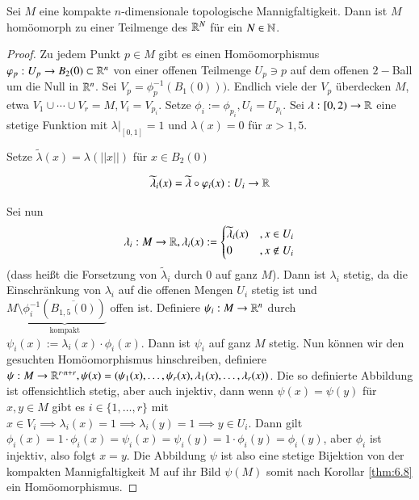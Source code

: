 \documentclass[a4paper,10pt]{scrartcl}
\begin{document}
\begin{st}
 Sei $M$ eine kompakte $n$-dimensionale topologische Mannigfaltigkeit. Dann ist $M$ homöomorph zu einer Teilmenge des $\mathbb{R}^N$ für ein $N\in \mathbb{N}$.
\end{st}
\begin{figure}[H]
\centering
 \fixme[fig36]
\caption{}
\end{figure}
\begin{proof}
 Zu jedem Punkt $p\in M$ gibt es einen Homöomorphismus $\varphi_p: U_p\to B_2(0) \subset \mathbb{R}^n$ von einer offenen Teilmenge $U_p\ni p$ auf dem offenen $2-$Ball um die Null in $\mathbb{R}^n$. Sei $V_p=\phi_p^{-1}(B_1(0)))$. Endlich viele der $V_p$ überdecken $M$, etwa $V_1 \cup \dotsb \cup V_r=M, V_i=V_{p_i}$. Setze $\phi_i:=\phi_{p_i}, U_i=U_{p_i}$. Sei $\lambda:[0,2)\to \mathbb{R}$ eine stetige Funktion mit $\lambda|_{[0,1]}=1$ und $\lambda(x)=0$ für $x>1,5$.
\begin{figure}[H]
\centering
 \fixme[fig37]
\caption{}
\end{figure}
Setze $\tilde \lambda(x)=\lambda(||x||)$ für $x\in B_2(0)$\\
\begin{figure}[H]
\centering
 \fixme[fig38]
\caption{}
\end{figure}
\[
 \widetilde \lambda_i(x)=\widetilde\lambda \circ \varphi_i(x): U_i\to \mathbb{R}
\]
\begin{figure}[H]
\centering
 \fixme[fig39]
\caption{}
\end{figure}
Sei nun 
\[
 \lambda_i: M \to \mathbb{R}, \lambda_i(x):=\begin{cases} \widetilde \lambda_i(x)&, x\in U_i\\ 0 &,x \notin U_i \end{cases}
\]
(dass heißt die Forsetzung von $\tilde\lambda_i$ durch $0$ auf ganz $M$). Dann ist $\lambda_i$ stetig, da die Einschränkung von $\lambda_i$ auf die offenen Mengen $U_i$ stetig ist und $M\setminus \underbrace{\phi_i^{-1}(\overline{B_{1,5}(0)})}_{\text{kompakt}}$ offen ist. Definiere $\psi_i: M\to \mathbb{R}^n$ durch $\psi_i(x):= \lambda_i(x)\cdot \phi_i(x)$. Dann ist $\psi_i$ auf ganz $M$ stetig.  Nun können wir den gesuchten Homöomorphismus hinschreiben, definiere $\psi: M\to \mathbb{R}^{r\cdot n+r} , \psi(x)=(\psi_1(x),\dotsc  , \psi_r(x), \lambda_1(x),\dotsc  , \lambda_r(x))$. Die so definierte Abbildung ist offensichtlich stetig, aber auch injektiv, dann wenn $\psi(x)=\psi(y)$ für $x,y\in M$ gibt es $i\in \{1,\dotsc  , r\}$ mit $x\in V_i \implies \lambda_i(x)=1 \implies \lambda_i(y)=1 \implies y \in U_i$. Dann gilt $\phi_i(x)=1\cdot \phi_i(x)=\psi_i(x)=\psi_i(y)=1\cdot \phi_i(y)= \phi_i(y)$, aber $\phi_i$ ist injektiv, also folgt $x=y$. Die Abbildung $\psi$ ist also eine stetige Bijektion von der kompakten Mannigfaltigkeit M auf ihr Bild $\psi(M)$ somit nach Korollar \ref{thm:6.8} ein Homöomorphismus.
\end{proof}
\end{document}
